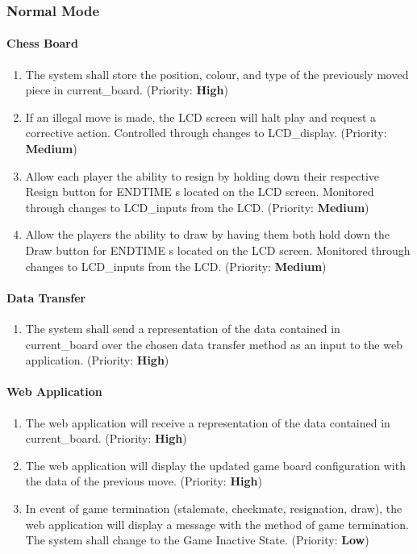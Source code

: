 \documentclass[12pt]{article}
\begin{document}
\subsubsection{Normal Mode}
\paragraph{Chess Board}
\begin{enumerate}[{NB}1., leftmargin=2\parindent]
    \item The system shall store the position, colour, and type of the previously moved piece in current\_board. (Priority: \textbf{High}) 
    \item If an illegal move is made, the LCD screen will halt play and request a corrective action. Controlled through changes to LCD\_display. (Priority: \textbf{Medium}) 
    \item Allow each player the ability to resign by holding down their respective Resign button for ENDTIME \si{\second} located on the LCD screen. Monitored through changes to LCD\_inputs from the LCD. (Priority: \textbf{Medium}) 
    \item Allow the players the ability to draw by having them both hold down the Draw button for ENDTIME \si{\second} located on the LCD screen. Monitored through changes to LCD\_inputs from the LCD. (Priority: \textbf{Medium}) 
\end{enumerate}

\paragraph{Data Transfer}
\begin{enumerate}[{ND}1., leftmargin=2\parindent]
    \item The system shall send a representation of the data contained in current\_board over the chosen data transfer method as an input to the web application. (Priority: \textbf{High}) 
\end{enumerate}

\paragraph{Web Application}
\begin{enumerate}[{NA}1., leftmargin=2\parindent]
    \item The web application will receive a representation of the data contained in current\_board. (Priority: \textbf{High}) 
    \item The web application will display the updated game board configuration with the data of the previous move. (Priority: \textbf{High}) 
    \item In event of game termination (stalemate, checkmate, resignation, draw), the web application will display a message with the method of game termination. The system shall change to the Game Inactive State. (Priority: \textbf{Low}) 
\end{enumerate}
\end{document}
